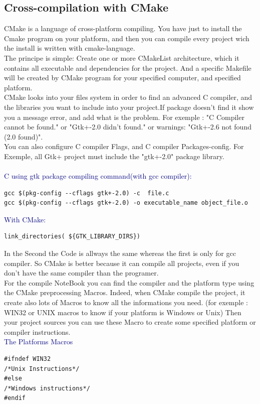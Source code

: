 \documentclass[11pt]{sample}
\begin{document}
\subsection{Cross-compilation with CMake}
CMake is a language of cross-platform compiling. You have just to install the Cmake program on your platform, and then you can compile every project wich the install is written with cmake-language.\\ 
The principe is simple: Create one or more CMakeList architecture\footnotemark, which it contains all executable and dependencies for the project. And a specific Makefile will be created by CMake program for your specified computer, and specified platform.\\
CMake looks into your files system in order to find an advanced C compiler, and the libraries you want to include into your project.If package doesn't find it show you a message error, and add what is the problem. For exemple : "C Compiler cannot be found." or "Gtk+-2.0 didn't found." or warnings: "Gtk+-2.6 not found (2.0 found)".\\
You can also configure C compiler Flags, and C compiler Packages-config. For Exemple, all Gtk+ project must include the "gtk+-2.0" package library.\\ 
\\\textcolor{Navy}{C using gtk package compiling command(with gcc compiler):}
\begin{verbatim}
gcc $(pkg-config --cflags gtk+-2.0) -c  file.c
gcc $(pkg-config --cflags gtk+-2.0) -o executable_name object_file.o
\end{verbatim}
\textcolor{Navy}{With CMake:}
\begin{verbatim}
link_directories( ${GTK_LIBRARY_DIRS})
\end{verbatim}
In the Second the Code is allways the same whereas the first is only for gcc compiler. So CMake is better because it can compile all projects, even if you don't have the same compiler than the programer.\\
For the compile NoteBook you can find the compiler and the platform type using the CMake preprocessing Macros. Indeed, when CMake compile the project, it create also lots of Macros to know all the informations you need. (for exemple : WIN32 or UNIX macros to know if your platform is Windows or Unix) Then your project sources you can use these Macro to create some specified platform or compiler instructions.\\
\textcolor{Navy}{The Platforms Macros}
\begin{verbatim}
#ifndef WIN32
/*Unix Instructions*/
#else
/*Windows instructions*/
#endif
\end{verbatim}
\end{document}
